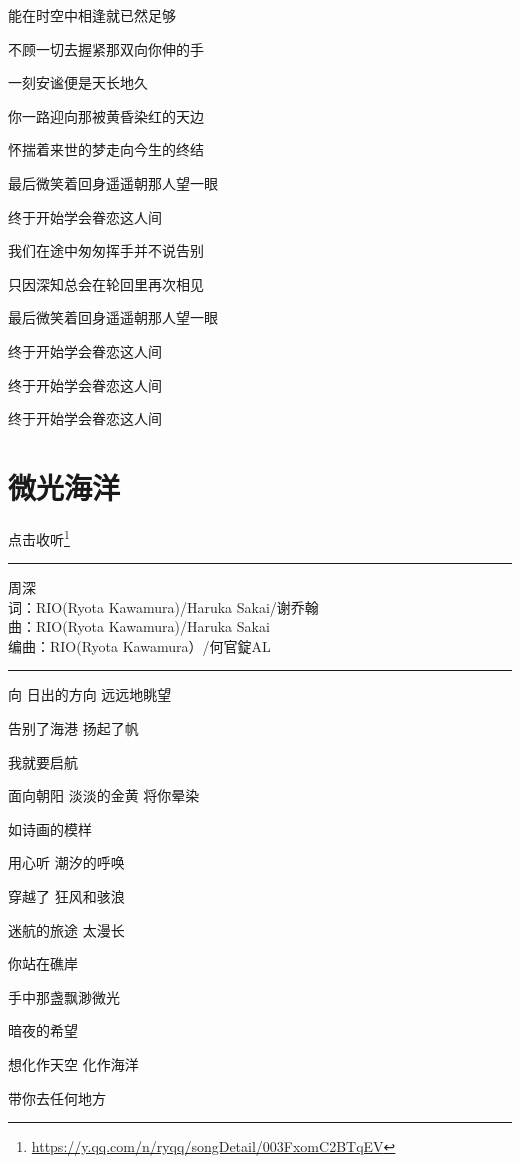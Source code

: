 \documentclass[]{ctexbook}
\renewcommand{\href}[2]{#2\footnote{\url{#1}}}
\begin{document}
能在时空中相逢就已然足够

不顾一切去握紧那双向你伸的手

一刻安谧便是天长地久

你一路迎向那被黄昏染红的天边

怀揣着来世的梦走向今生的终结

最后微笑着回身遥遥朝那人望一眼

终于开始学会眷恋这人间

我们在途中匆匆挥手并不说告别

只因深知总会在轮回里再次相见

最后微笑着回身遥遥朝那人望一眼

终于开始学会眷恋这人间

终于开始学会眷恋这人间

终于开始学会眷恋这人间

\section*{微光海洋}\label{sea-of-shimmer}


\href{https://y.qq.com/n/ryqq/songDetail/003FxomC2BTqEV}{点击收听}

\begin{center}\rule{0.5\linewidth}{0.5pt}\end{center}

周深\\
词：RIO(Ryota Kawamura)/Haruka Sakai/谢乔翰\\
曲：RIO(Ryota Kawamura)/Haruka Sakai\\
编曲：RIO(Ryota Kawamura）/何官錠AL

\begin{center}\rule{0.5\linewidth}{0.5pt}\end{center}

向 日出的方向 远远地眺望

告别了海港 扬起了帆

我就要启航

面向朝阳 淡淡的金黄 将你晕染

如诗画的模样

用心听 潮汐的呼唤

穿越了 狂风和骇浪

迷航的旅途 太漫长

你站在礁岸

手中那盏飘渺微光

暗夜的希望

想化作天空 化作海洋

带你去任何地方
\end{document}
